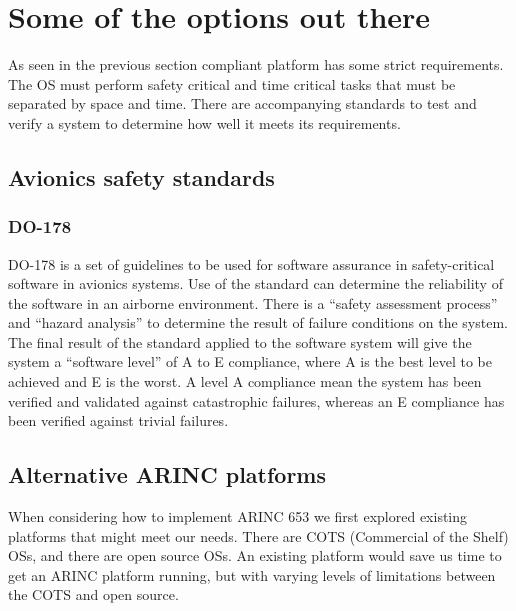 \iffalse
\section{Some of the options out there}
As seen in the previous section \arinc{} compliant platform has some strict requirements.
The OS must perform safety critical and time critical tasks that must be separated by space and time.
There are accompanying standards to test and verify a system to determine how well it meets its requirements.

\subsection{Avionics safety standards}

\subsubsection{DO-178}
DO-178 is a set of guidelines to be used for software assurance in safety-critical software in avionics systems.
Use of the standard can determine the reliability of the software in an airborne environment.
There is a ``safety assessment process'' and ``hazard analysis'' to determine the result of failure conditions on the system.
The final result of the standard applied to the software system will give the system a ``software level'' of A to E compliance,
where A is the best level to be achieved and E is the worst.
A level A compliance mean the system has been verified and validated against catastrophic failures,
whereas an E compliance has been verified against trivial failures.

\subsection{Alternative ARINC platforms}
When considering how to implement ARINC 653 we first explored existing platforms that might meet our needs.
There are COTS (Commercial of the Shelf) OSs, and there are open source OSs.
An existing platform would save us time to get an ARINC platform running,
but with varying levels of limitations between the COTS and open source.

